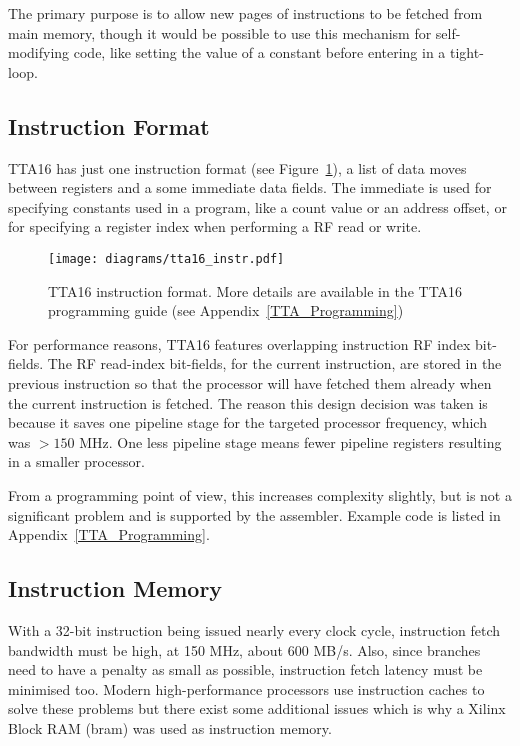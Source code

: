 The primary purpose is to allow new pages of instructions to be fetched from main
memory, though it would be possible to use this mechanism for self-modifying
code, like setting the value of a constant before entering in a tight-loop.


\subsection{Instruction Format}
TTA16 has just one instruction format (see Figure~\ref{TTA_Instruction_Format}),
a list of data moves between registers and a some immediate data fields. The
immediate is used for specifying constants used in a program, like a count
value or an address offset, or for specifying a register index when performing
a RF read or write.

\begin{figure}[h!]
\begin{center}
\texttt{[image: diagrams/tta16\_instr.pdf]}
\caption[TTA16 instruction format]{TTA16 instruction format. More details are
available in the TTA16 programming guide (see Appendix~\ref{TTA_Programming})}
\label{TTA_Instruction_Format}
\end{center}
\end{figure}

For performance reasons, TTA16 features overlapping instruction RF index
bit-fields. The RF read-index bit-fields, for the current instruction, are stored
in the previous instruction so that the processor will have fetched them already
when the current instruction is fetched. The reason this design decision was
taken is because it saves one pipeline stage for the targeted processor
frequency, which was $>150$ MHz. One less pipeline stage means fewer pipeline
registers resulting in a smaller processor.

From a programming point of view, this increases complexity slightly, but is not
a significant problem and is supported by the assembler. Example code is listed
in Appendix~\ref{TTA_Programming}.


\subsection{Instruction Memory}
\label{TTA_Instr_Mem}
With a 32-bit instruction being issued nearly every clock cycle, instruction
fetch bandwidth must be high, at 150 MHz, about 600 MB/s. Also, since branches
need to have a penalty as small as possible, instruction fetch latency must be
minimised too. Modern high-performance processors use instruction caches to
solve these problems but there exist some additional issues which is why a Xilinx
Block RAM (\gls{bram}) was used
as instruction memory.

